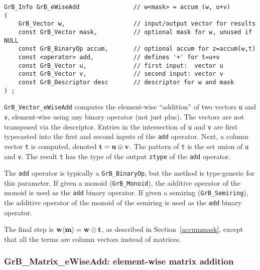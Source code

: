 \documentclass[12pt]{article}
\begin{document}
{\begin{mdframed}[userdefinedwidth=6in]
{\footnotesize
\begin{verbatim}
GrB_Info GrB_eWiseAdd               // w<mask> = accum (w, u+v)
(
    GrB_Vector w,                   // input/output vector for results
    const GrB_Vector mask,          // optional mask for w, unused if NULL
    const GrB_BinaryOp accum,       // optional accum for z=accum(w,t)
    const <operator> add,           // defines '+' for t=u+v
    const GrB_Vector u,             // first input:  vector u
    const GrB_Vector v,             // second input: vector v
    const GrB_Descriptor desc       // descriptor for w and mask
) ;
\end{verbatim} } \end{mdframed}

\verb'GrB_Vector_eWiseAdd' computes the element-wise ``addition'' of two
vectors \verb'u' and \verb'v', element-wise using any binary operator (not just
plus).  The vectors are not transposed via the descriptor.  Entries in the
intersection of \verb'u' and \verb'v' are first typecasted into the first and
second inputs of the \verb'add' operator.  Next, a column vector \verb't' is
computed, denoted ${\bf t = u \oplus v}$.  The pattern of \verb't' is the set
union of \verb'u' and \verb'v'.  The result \verb't' has the type of the output
\verb'ztype' of the \verb'add' operator.

The \verb'add' operator is typically a \verb'GrB_BinaryOp', but the method is
type-generic for this parameter.  If given a monoid (\verb'GrB_Monoid'), the
additive operator of the monoid is used as the \verb'add' binary operator.  If
given a semiring (\verb'GrB_Semiring'), the additive operator of the monoid of
the semiring is used as the \verb'add' binary operator.

The final step is ${\bf w \langle m \rangle  = w \odot t}$, as described in
Section~\ref{accummask}, except that all the terms are column vectors instead
of matrices.

\subsubsection{{\sf GrB\_Matrix\_eWiseAdd:} element-wise matrix addition}
\label{eWiseAdd_matrix}

}
\end{document}
